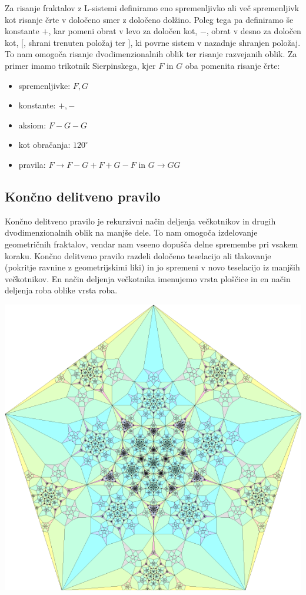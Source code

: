 \documentclass[a4paper, 12px]{article}
\begin{document}
        \addvspace{0.5cm}
        Za risanje fraktalov z L-sistemi definiramo eno spremenljivko ali več spremenljivk kot risanje črte v določeno smer z določeno dolžino.
        Poleg tega pa definiramo še konstante $+$, kar pomeni obrat v levo za določen kot, $-$, obrat v desno za določen kot, $[$, shrani trenuten položaj ter $]$, ki povrne sistem v nazadnje shranjen položaj.
        To nam omogoča risanje dvodimenzionalnih oblik ter risanje razvejanih oblik.
        Za primer imamo trikotnik Sierpinskega, kjer $F$ in $G$ oba pomenita risanje črte:
        \cite{LSystem}
        \begin{itemize}
            \item[] spremenljivke: $F, G$
            \item[] konstante: $+, -$
            \item[] aksiom: $F-G-G$
            \item[] kot obračanja: $120^\circ$
            \item[] pravila: $F \rightarrow F-G+F+G-F$ in $G \rightarrow GG$    
        \end{itemize} 

    \subsection{Končno delitveno pravilo}
        Končno delitveno pravilo je rekurzivni način deljenja večkotnikov in drugih dvodimenzionalnih oblik na manjše dele.
        To nam omogoča izdelovanje geometričnih fraktalov, vendar nam vseeno dopušča delne spremembe pri vsakem koraku.
        Končno delitveno pravilo razdeli določeno teselacijo ali tlakovanje (pokritje ravnine z geometrijskimi liki) in jo spremeni v novo teselacijo iz manjših večkotnikov.
        En način deljenja večkotnika imenujemo vrsta ploščice in en način deljenja roba oblike vrsta roba.
        \cite{FSR}
        \centerline{\includegraphics[scale=0.3]{fsr-fractal.png}}
        \begingroup
        \endgroup
\end{document}
